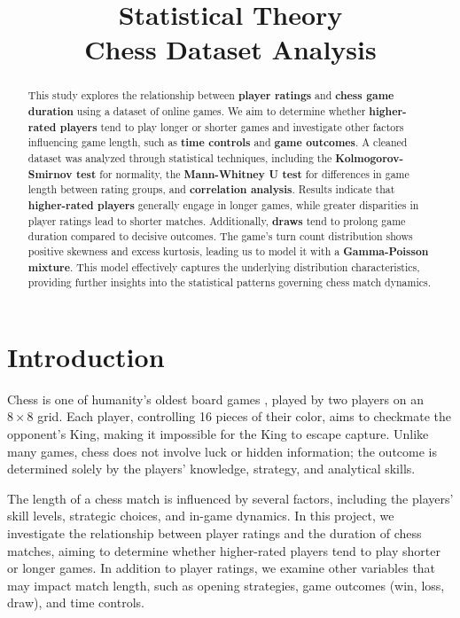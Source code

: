 \documentclass[conference]{IEEEtran}
\title{
Statistical Theory\\
Chess Dataset Analysis
}
\author{
   \IEEEauthorblockN{Dor Boker, Itamar Nakar}
   \IEEEauthorblockA{
      I.D: 209271279 , 325829000\\
      Email: dorboker@gmail.com, itamar.nakar@gmail.com
   }
}
\begin{document}
\maketitle


\begin{abstract}
This study explores the relationship between \textbf{player ratings} and \textbf{chess game duration} using a dataset of online games. We aim to determine whether \textbf{higher-rated players} tend to play longer or shorter games and investigate other factors influencing game length, such as \textbf{time controls} and \textbf{game outcomes}. A cleaned dataset was analyzed through statistical techniques, including the \textbf{Kolmogorov-Smirnov test} for normality, the \textbf{Mann-Whitney U test} for differences in game length between rating groups, and \textbf{correlation analysis}. Results indicate that \textbf{higher-rated players} generally engage in longer games, while greater disparities in player ratings lead to shorter matches. Additionally, \textbf{draws} tend to prolong game duration compared to decisive outcomes. The game's turn count distribution shows positive skewness and excess kurtosis, leading us to model it with a \textbf{Gamma-Poisson mixture}. This model effectively captures the underlying distribution characteristics, providing further insights into the statistical patterns governing chess match dynamics.
\end{abstract}



\section{Introduction}
Chess is one of humanity's oldest board games \cite{chesswiki}, played by two players on an $8\times8$ grid. Each player, controlling 16 pieces of their color, aims to checkmate the opponent's King, making it impossible for the King to escape capture. Unlike many games, chess does not involve luck or hidden information; the outcome is determined solely by the players' knowledge, strategy, and analytical skills.

The length of a chess match is influenced by several factors, including the players' skill levels, strategic choices, and in-game dynamics. In this project, we investigate the relationship between player ratings and the duration of chess matches, aiming to determine whether higher-rated players tend to play shorter or longer games. In addition to player ratings, we examine other variables that may impact match length, such as opening strategies, game outcomes (win, loss, draw), and time controls.
\end{document}
